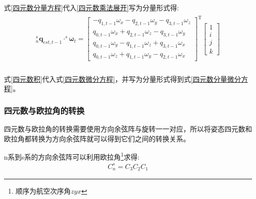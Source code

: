 \documentclass[12pt,a4paper]{article}
\renewcommand{\citep}[1]{\textsuperscript{\cite{#1}}}
\begin{document}
式\ref{四元数分量方程}代入\ref{四元数乘法展开}写为分量形式得:
\begin{eqnarray}\label{四元数积}
    \begin{split} 
        ^s_n\bm{q}_{est,t-1}\cdot^s{\bm{\omega}}_t=
        \left[\begin{matrix}
                -q_{1,t-1}\omega_x-q_{2,t-1}\omega_y-q_{3,t-1}\omega_z \\
                 q_{0,t-1}\omega_x+q_{2,t-1}\omega_z-q_{3,t-1}\omega_y \\
                 q_{0,t-1}\omega_y-q_{1,t-1}\omega_z+q_{3,t-1}\omega_x \\
                 q_{0,t-1}\omega_z+q_{1,t-1}\omega_y-q_{2,t-1}\omega_x
        \end{matrix}\right]^\mathrm{T}
        \left[\begin{matrix}
                1 \\ i \\ j \\ k
        \end{matrix}\right] \\
    \end{split}
\end{eqnarray} 

式\ref{四元数积}代入式\ref{四元数微分方程}，并写为分量形式得到式\ref{四元数分量微分方程}。

\subsubsection{四元数与欧拉角的转换}\label{section:四元数与欧拉角的转换}
四元数与欧拉角的转换需要使用方向余弦阵与旋转一一对应，所以将姿态四元数和欧拉角都转换为方向余弦阵就可以得到它们之间的转换关系。

n系到s系的方向余弦阵可以利用欧拉角\footnote{顺序为航空次序角$zyx$}\citep{捷联惯导航}求得:
\begin{equation}\label{欧拉角方向余弦}
    \begin{split} 
        C^s_n=C_3C_2C_1
    \end{split}
\end{equation} 
\end{document}
